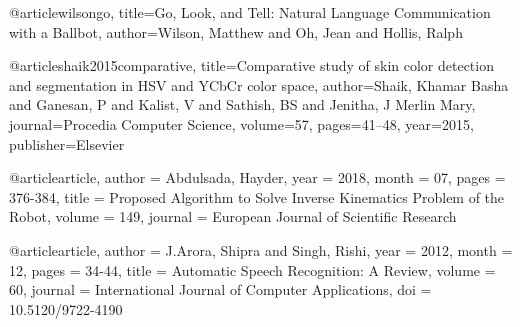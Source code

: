 @article{wilsongo,
  title={Go, Look, and Tell: Natural Language Communication with a Ballbot},
  author={Wilson, Matthew and Oh, Jean and Hollis, Ralph}
}

@article{shaik2015comparative,
  title={Comparative study of skin color detection and segmentation in HSV and YCbCr color space},
  author={Shaik, Khamar Basha and Ganesan, P and Kalist, V and Sathish, BS and Jenitha, J Merlin Mary},
  journal={Procedia Computer Science},
  volume={57},
  pages={41--48},
  year={2015},
  publisher={Elsevier}
}


@article{article,
author = {Abdulsada, Hayder},
year = {2018},
month = {07},
pages = {376-384},
title = {Proposed Algorithm to Solve Inverse Kinematics Problem of the Robot},
volume = {149},
journal = {European Journal of Scientific Research}
}

@article{article,
author = {J.Arora, Shipra and Singh, Rishi},
year = {2012},
month = {12},
pages = {34-44},
title = {Automatic Speech Recognition: A Review},
volume = {60},
journal = {International Journal of Computer Applications},
doi = {10.5120/9722-4190}
}
